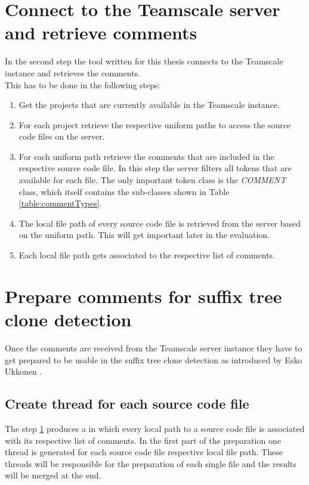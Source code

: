 \section{Connect to the Teamscale server and retrieve comments}
\label{section:retrieveComments}
In the second step the tool written for this thesis connects to the Teamscale instance and retrieves the comments.\\
This has to be done in the following steps:
\begin{enumerate}
	\item Get the projects that are currently available in the Teamscale instance. 
	\item For each project retrieve the respective uniform paths to access the source code files on the server.
	\item For each uniform path retrieve the comments that are included in the respective source code file. In this step the server filters all tokens that are available for each file. The only important token class is the \textit{COMMENT} class, which itself contains the sub-classes shown in Table \ref{table:commentTypes}.
	\item The local file path of every source code file is retrieved from the server based on the uniform path. This will get important later in the evaluation.
	\item Each local file path gets associated to the respective list of comments.
\end{enumerate}




\section{Prepare comments for suffix tree clone detection}
Once the comments are received from the Teamscale server instance they have to get prepared to be usable in the suffix tree clone detection as introduced by Esko Ukkonen \cite{Ukkonen1995}\cite{Ukkonen1993}.\\
\subsection{Create thread for each source code file}
The step \ref{section:retrieveComments} produces a  in which every local path to a source code file is associated with its respective list of comments.
In the first part of the preparation one thread is generated for each source code file respective local file path. These threads will be responsible for the preparation of each single file and the results will be merged at the end.
